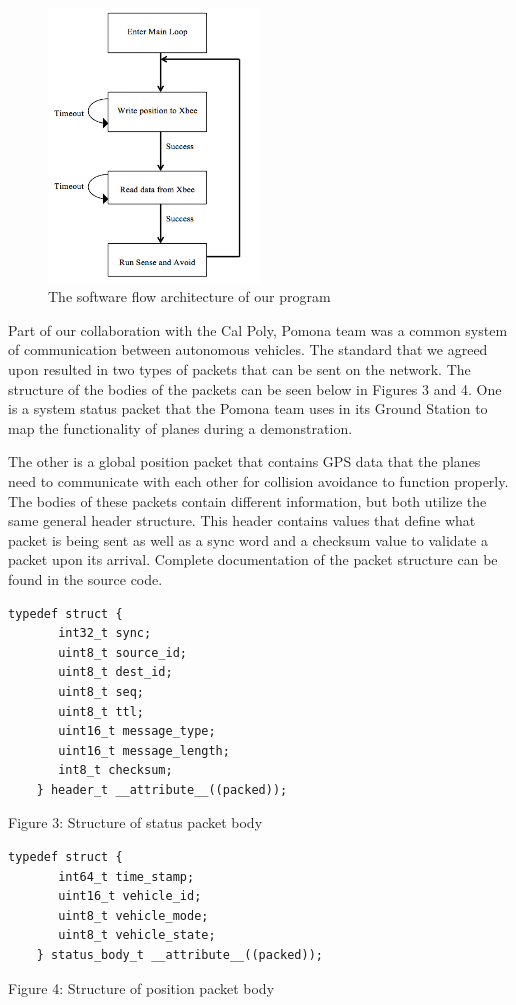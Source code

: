 \documentclass[12pt]{article}
\begin{document}
\begin{figure}[ht!]
   \centering
   \includegraphics[width=0.5\textwidth]{flow.png}
   \caption{The software flow architecture of our program}
\end{figure}

Part of our collaboration with the Cal Poly, Pomona team was a common system of communication between autonomous vehicles. The standard that we agreed upon resulted in two types of packets that can be sent on the network. The structure of the bodies of the packets can be seen below in Figures 3 and 4. One is a system status packet that the Pomona team uses in its Ground Station to map the functionality of planes during a demonstration.

The other is a global position packet that contains GPS data that the planes need to communicate with each other for collision avoidance to function properly. The bodies of these packets contain different information, but both utilize the same general header structure. This header contains values that define what packet is being sent as well as a sync word and a checksum value to validate a packet upon its arrival. Complete documentation of the packet structure can be found in the source code.

\begin{centering}
\begin{Verbatim}[fontsize=\scriptsize]
	typedef struct {
	   int32_t sync;
	   uint8_t source_id;
	   uint8_t dest_id;
	   uint8_t seq;
	   uint8_t ttl;
	   uint16_t message_type;
	   uint16_t message_length;
	   int8_t checksum;
	} header_t __attribute__((packed));
\end{Verbatim}
Figure 3: Structure of status packet body

\begin{Verbatim}[fontsize=\scriptsize]
	typedef struct {
	   int64_t time_stamp;
	   uint16_t vehicle_id;
	   uint8_t vehicle_mode;
	   uint8_t vehicle_state;
	} status_body_t __attribute__((packed));
\end{Verbatim}
Figure 4: Structure of position packet body\par
\end{centering}
\bigskip
\end{document}
